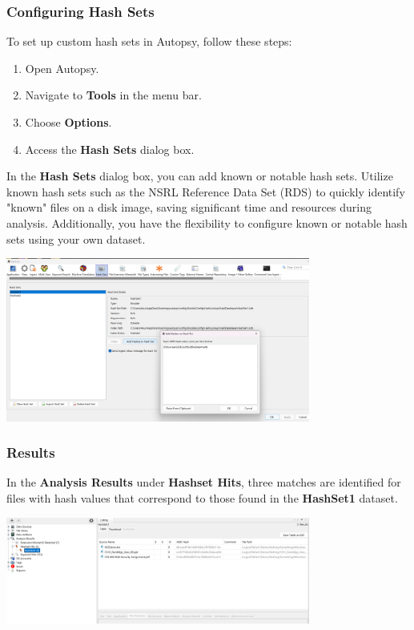 \documentclass{extarticle}
\begin{document}
\subsubsection*{Configuring Hash Sets}

To set up custom hash sets in Autopsy, follow these steps:

\begin{enumerate}
  \item Open Autopsy.
  \item Navigate to \textbf{Tools} in the menu bar.
  \item Choose \textbf{Options}.
  \item Access the \textbf{Hash Sets} dialog box.
\end{enumerate}

In the \textbf{Hash Sets} dialog box, you can add known or notable hash sets. Utilize known hash sets such as the NSRL Reference Data Set (RDS) to quickly identify "known" files on a disk image, saving significant time and resources during analysis. Additionally, you have the flexibility to configure known or notable hash sets using your own dataset.

\begin{center}
    \includegraphics[width=0.75\textwidth]{3/3.2/Hash Set Custom Configuration.png}
\end{center}

\subsubsection*{Results}
In the \textbf{Analysis Results} under \textbf{Hashset Hits}, three matches are identified for files with hash values that correspond to those found in the \textbf{HashSet1} dataset.
\begin{center}
    \includegraphics[width=0.75\textwidth]{3/3.2/Results of Hash Lookup ingest module.png}
\end{center}
\end{document}
